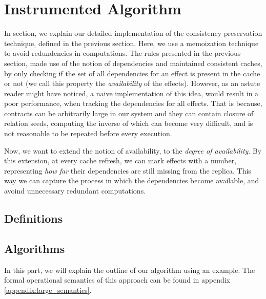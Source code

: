 \newpage
\section{Instrumented Algorithm}
%
In section, we explain our detailed implementation of the consistency
preservation technique, defined in the previous section. Here, we use a
memoization technique to avoid redundencies in computations. The rules
presented in the previous section, made use of the notion of
dependencies and maintained consistent caches, by only checking if the
set of all dependencies for an effect is present in the cache or not (we
call this property the \emph{availability} of the effects).  
However, as an astute reader might have noticed, a naive implementation
of this idea, would result in a poor performance, when tracking the
dependencies for all effects. That is because, contracts can be
arbitrarily large in our system 
and they can contain closure of relation seeds, computing the
inverse of which can become very difficult, and is not reasonable to be
repeated before every execution. 


Now, we want to extend the notion of availability, to the \emph{degree of
availability}. By this extension, at every cache refresh, we can mark effects with a number,
representing \emph{how far} their dependencies are still missing from
the replica. This way we can capture the process in which the dependencies
become available, and avoind unnecessary redundant computations. 
\subsection{Definitions}

\subsection{Algorithms}
In this part, we will explain the outline of our algorithm using
an example. The formal operational semantics of this approach can be
found in appendix \ref{appendix:large_semantics}.

